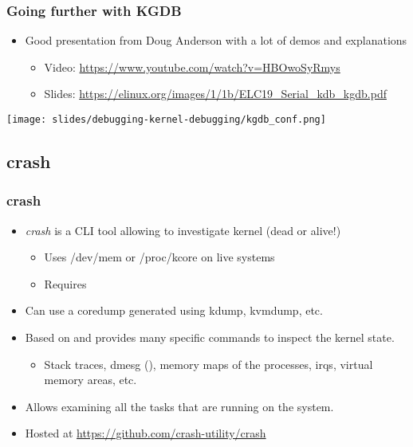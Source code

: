\begin{frame}[fragile]
  \frametitle{Going further with KGDB}
  \begin{itemize}
    \item Good presentation from Doug Anderson with a lot of demos and
          explanations
    \begin{itemize}
      \item Video: \url{https://www.youtube.com/watch?v=HBOwoSyRmys}
      \item Slides: \url{https://elinux.org/images/1/1b/ELC19_Serial_kdb_kgdb.pdf}
    \end{itemize}
  \end{itemize}
  \vspace{0.5cm}
  \begin{center}
  \center\texttt{[image: slides/debugging-kernel-debugging/kgdb\_conf.png]}
  \end{center}
\end{frame}

\subsection{crash}

\begin{frame}
  \frametitle{crash}
  \begin{itemize}
    \item {\em crash} is a CLI tool allowing to investigate kernel (dead or
      alive!)
    \begin{itemize}
      \item Uses /dev/mem or /proc/kcore on live systems
      \item Requires 
    \end{itemize}
    \item Can use a coredump generated using kdump, kvmdump, etc.
    \item Based on  and provides many specific commands to inspect the
      kernel state.
    \begin{itemize}
      \item Stack traces, dmesg (), memory maps of the processes,
            irqs, virtual memory areas, etc.
    \end{itemize}
    \item Allows examining all the tasks that are running on the system.
    \item Hosted at \url{https://github.com/crash-utility/crash}
  \end{itemize}
\end{frame}

